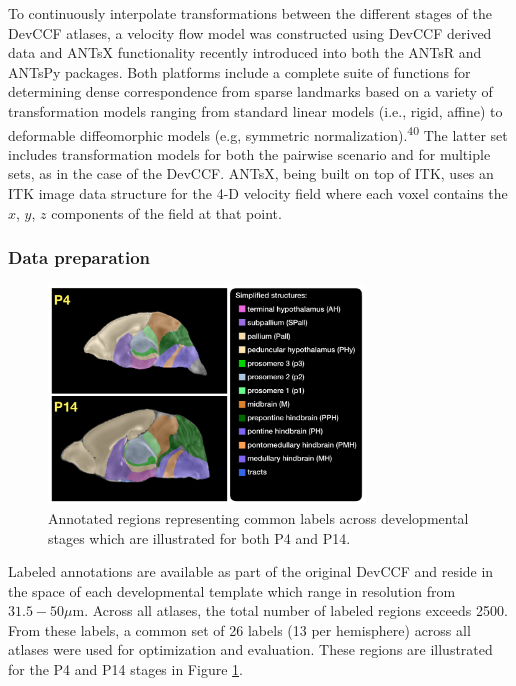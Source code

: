 \documentclass[
  12pt,
]{article}
\begin{document}
To continuously interpolate transformations between the different stages
of the DevCCF atlases, a velocity flow model was constructed using
DevCCF derived data and ANTsX functionality recently introduced into
both the ANTsR and ANTsPy packages. Both platforms include a complete
suite of functions for determining dense correspondence from sparse
landmarks based on a variety of transformation models ranging from
standard linear models (i.e., rigid, affine) to deformable diffeomorphic
models (e.g, symmetric normalization).\textsuperscript{40} The latter
set includes transformation models for both the pairwise scenario and
for multiple sets, as in the case of the DevCCF. ANTsX, being built on
top of ITK, uses an ITK image data structure for the 4-D velocity field
where each voxel contains the \(x\), \(y\), \(z\) components of the
field at that point.

\hypertarget{data-preparation}{%
\subsubsection{Data preparation}\label{data-preparation}}

\begin{figure}[!htb]
\centering
\includegraphics[width=0.75\textwidth]{Figures/SimplifiedAnnotations.pdf}
\caption{Annotated regions representing common labels across developmental stages which
are illustrated for both P4 and P14.}
\label{fig:simplifiedannotations}
\end{figure}

Labeled annotations are available as part of the original DevCCF and
reside in the space of each developmental template which range in
resolution from \(31.5-50 \mu\)m. Across all atlases, the total number
of labeled regions exceeds 2500. From these labels, a common set of 26
labels (13 per hemisphere) across all atlases were used for optimization
and evaluation. These regions are illustrated for the P4 and P14 stages
in Figure \ref{fig:simplifiedannotations}.
\end{document}
